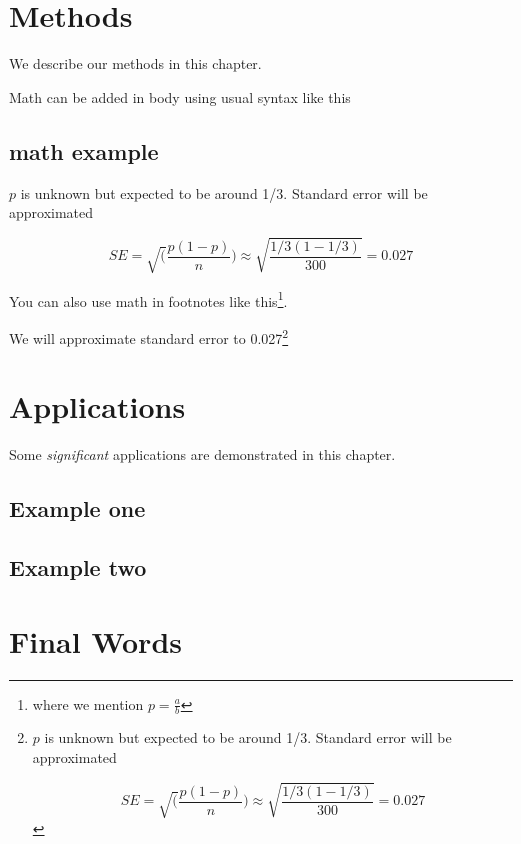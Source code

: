 \documentclass[
]{book}
\theoremstyle{definition}
\theoremstyle{definition}
\theoremstyle{definition}
\theoremstyle{definition}
\theoremstyle{remark}
\begin{document}
\hypertarget{methods}{%
\chapter{Methods}\label{methods}}

We describe our methods in this chapter.

Math can be added in body using usual syntax like this

\hypertarget{math-example}{%
\section{math example}\label{math-example}}

\(p\) is unknown but expected to be around 1/3. Standard error will be approximated

\[
SE = \sqrt(\frac{p(1-p)}{n}) \approx \sqrt{\frac{1/3 (1 - 1/3)} {300}} = 0.027
\]

You can also use math in footnotes like this\footnote{where we mention \(p = \frac{a}{b}\)}.

We will approximate standard error to 0.027\footnote{\(p\) is unknown but expected to be around 1/3. Standard error will be approximated

  \[
  SE = \sqrt(\frac{p(1-p)}{n}) \approx \sqrt{\frac{1/3 (1 - 1/3)} {300}} = 0.027
  \]}

\hypertarget{applications}{%
\chapter{Applications}\label{applications}}

Some \emph{significant} applications are demonstrated in this chapter.

\hypertarget{example-one}{%
\section{Example one}\label{example-one}}

\hypertarget{example-two}{%
\section{Example two}\label{example-two}}

\hypertarget{final-words}{%
\chapter{Final Words}\label{final-words}}
\end{document}
